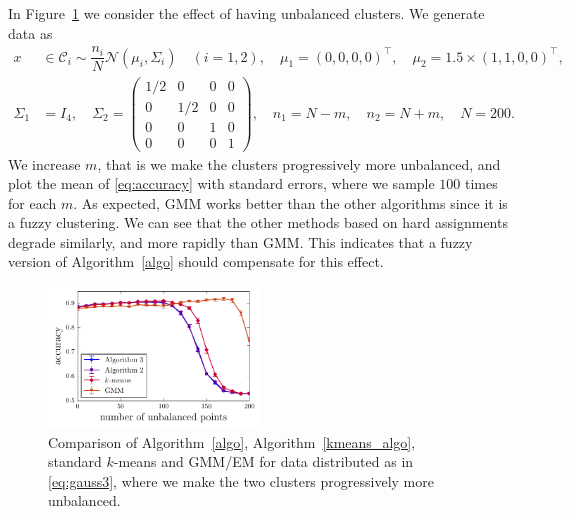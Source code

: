 \documentclass[aps,preprint,nofootinbib,floatfix]{revtex4-1}
\newcommand\C{{\mathcal{C}}}
\begin{document}
In Figure~\ref{fig:unbalanced} we consider the effect of having 
unbalanced clusters. We generate data as
\begin{equation}
\label{eq:gauss3}
\begin{split}
x &\in \C_i \sim  
\dfrac{n_i}{N} \mathcal{N}(\mu_i,\Sigma_i) \quad (i=1,2), \quad 
\mu_1 = (0,0,0,0)^\top , \quad
\mu_2 = 1.5\times (1,1,0,0)^\top, \\
\Sigma_1 &= I_4, \quad
\Sigma_2 = \left( 
\begin{smallmatrix} 
1/2 & 0 & 0 & 0\\
0 & 1/2 & 0 & 0 \\
0 & 0 & 1 & 0 \\
0 & 0 & 0 & 1 
\end{smallmatrix}\right), \quad
n_1 = N - m, \quad  n_2 = N + m, \quad N=200.
\end{split}
\end{equation}
We increase $m$, that is we make the clusters progressively more unbalanced,
and plot the mean of \eqref{eq:accuracy} with standard errors, where
we sample $100$ times for each $m$.
As expected, GMM
works better than the other algorithms since it is a fuzzy clustering.
We can see that the other methods based on hard assignments degrade similarly,
and  more rapidly than GMM. This indicates that a fuzzy version of
Algorithm~\ref{algo} should compensate for this effect.

\begin{figure}
\centering
\includegraphics[width=0.5\textwidth]{gauss_pi.pdf}
\caption{
\label{fig:unbalanced}
Comparison of Algorithm~\ref{algo}, Algorithm~\ref{kmeans_algo}, standard
$k$-means and GMM/EM for data distributed as in \eqref{eq:gauss3}, where
we make the two clusters progressively more unbalanced.
}
\end{figure}
\end{document}
